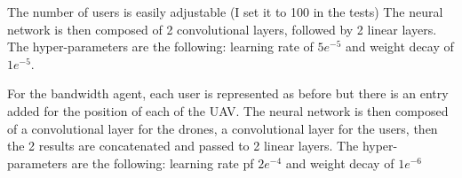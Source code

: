 \documentclass[letterpaper]{article}
\begin{document}
The number of users is easily adjustable (I set it to 100 in the tests)
The neural network is then composed of 2 convolutional layers, followed by 2 linear layers.
The hyper-parameters are the following: learning rate of $5e^{-5}$ and weight decay of $1e^{-5}$.

\;

For the bandwidth agent, each user is represented as before but there is an entry added for the position of each of the UAV.
The neural network is then composed of a convolutional layer for the drones, a convolutional layer for the users,
then the 2 results are concatenated and passed to 2 linear layers.
The hyper-parameters are the following: learning rate pf $2e^{-4}$ and weight decay of $1e^{-6}$
\end{document}
